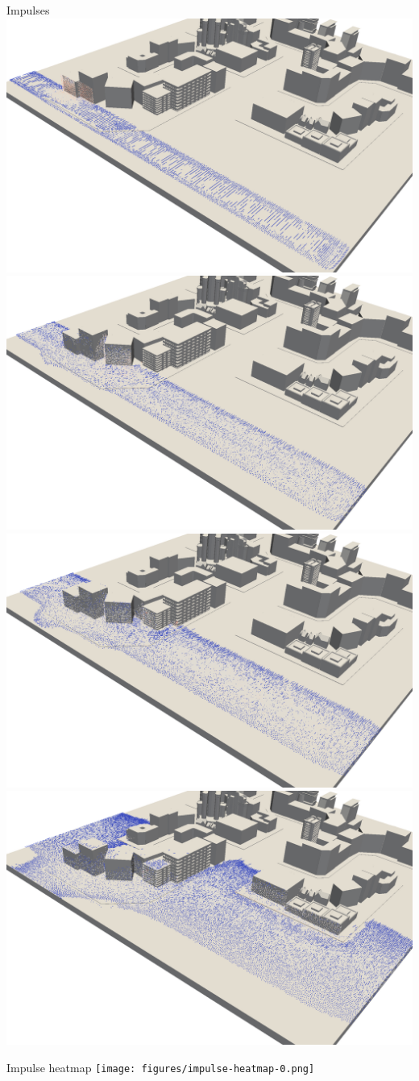 \documentclass[8pt,sans,mathserif,aspectratio=43]{beamer}
\begin{document}
\begin{frame}{Impulses}
  \includegraphics[width=.5\textwidth]{figures/impulses-0.png}
  \includegraphics[width=.5\textwidth]{figures/impulses-1.png}\\
  \includegraphics[width=.5\textwidth]{figures/impulses-2.png}
  \includegraphics[width=.5\textwidth]{figures/impulses-3.png}
\end{frame}


\begin{frame}{Impulse heatmap}
  \texttt{[image: figures/impulse-heatmap-0.png]}
\end{frame}

\end{document}
